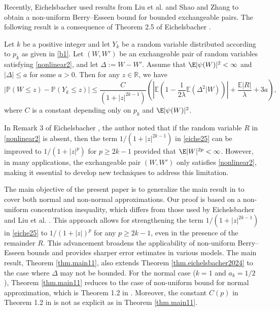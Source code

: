 	Recently, Eichelsbacher \cite{eichelsbacher2024stein} used results from Liu et al. \cite{liu2021non} and Shao and Zhang \cite{shao2019berry}
	to obtain a non-uniform Berry--Esseen bound for bounded exchangeable pairs.
The following result is a consequence of Theorem 2.5 of Eichelsbacher \cite{eichelsbacher2024stein}.
	\begin{theorem}\label{thm.eichelsbacher2024}
		Let $k$ be a positive integer and let $Y_k$ be a random variable distributed according to $p_k$ as given in \eqref{b1}. 
		Let $(W, W')$ be an exchangeable pair of random variables satisfying \eqref{nonlinear2}, and let $\Delta := W - W'$. 
		Assume that $\E|\psi(W)|^{2} < \infty$ and $|\Delta| \le a$ for some $a>0$. Then for any $z \in \mathbb{R}$, we have
		\begin{equation}\label{eiche25}		\left| \mathbb{P}(W \le z) - \mathbb{P}(Y_k \le z) \right| \le 
			\dfrac{C}{\left( 1 + |z|^{2k-1} \right)}  
			\left(\left| \mathbb{E} \left( 1 - \frac{1}{2\lambda}\mathbb{E}(\Delta^2|W) \right) \right| + \dfrac{\mathbb{E}|R|}{\lambda} + 3a\right),
		\end{equation}
		where $C$ is a constant depending only on $p_k$ and $\E|\psi(W)|^2$.
	\end{theorem}
	
	In Remark 3 of Eichelsbacher \cite{eichelsbacher2024stein}, the author noted that if the random variable $R$ in \eqref{nonlinear2} is absent, 
	then the term $1/(1+|z|^{2k-1})$ in \eqref{eiche25} can be improved to $1/(1+|z|^{p})$ for $p\ge 2k-1$ 
	provided that $\E|W|^{2p}<\infty$.
	However, in many applications, the exchangeable pair $(W,W')$
	only satisfies \eqref{nonlinear2}, making it essential to develop new techniques to address this limitation.
	
	The main objective of the present paper is to generalize the main result in \cite{thanh2025non}
	to cover both normal and non-normal approximations. Our proof is based on a non-uniform concentration inequality, which differs from those used by
	Eichelsbacher \cite{eichelsbacher2024stein} and Liu et al. \cite{liu2021non}.
	This approach allows for strengthening the term
	$1/(1+|z|^{2k-1})$ in \eqref{eiche25} to $1/(1+|z|)^p$ for any $p\ge 2k-1$, even in the presence of the remainder 
	$R$. This advancement broadens the applicability of non-uniform Berry--Esseen bounds and provides sharper error estimates in various models.
	The main result, Theorem \ref{thm.main11}, also extends Theorem \ref{thm.eichelsbacher2024} to the case where $\Delta$ may not be bounded.
	For the normal case ($k=1$ and $a_k=1/2$), Theorem \ref{thm.main11} reduces to the case of non-uniform bound for normal approximation, which is Theorem 1.2 in \cite{thanh2025non}. Moreover, the constant $C(p)$ in Theorem 1.2 in \cite{thanh2025non} is not as explicit as in Theorem \ref{thm.main11}.
	
